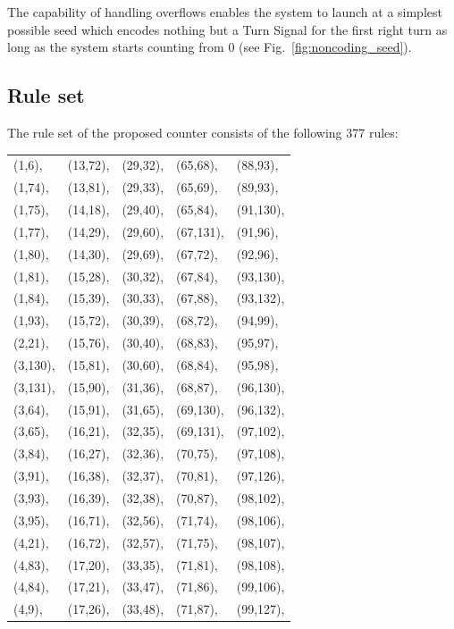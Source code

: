 \documentclass[twocolumn]{svjour3}
\begin{document}
The capability of handling overflows enables the system to launch at a simplest possible seed which encodes nothing but a Turn Signal for the first right turn as long as the system starts counting from 0 (see Fig.~\ref{fig:noncoding_seed}). 

\subsection{Rule set}
\label{subsect:ruleset}

The rule set of the proposed counter consists of the following 377 rules: 
\begin{center}
\begin{supertabular}[tb]{l l l l l}
\label{table:rule}
(1,6),&(13,72),&(29,32), &(65,68),&(88,93),\\
(1,74),&(13,81),&(29,33),&(65,69),&(89,93),\\
(1,75),&(14,18),&(29,40),&(65,84),&(91,130),\\
(1,77),&(14,29),&(29,60),&(67,131),&(91,96),\\
(1,80),&(14,30),&(29,69),&(67,72),&(92,96),\\
(1,81),&(15,28),&(30,32),&(67,84),&(93,130),\\
(1,84),&(15,39),&(30,33),&(67,88),&(93,132),\\
(1,93),&(15,72),&(30,39),&(68,72),&(94,99),\\
(2,21),&(15,76),&(30,40),&(68,83),&(95,97),\\
(3,130),&(15,81),&(30,60),&(68,84),&(95,98),\\
(3,131),&(15,90),&(31,36),&(68,87),&(96,130),\\
(3,64),&(15,91),&(31,65),&(69,130),&(96,132),\\
(3,65),&(16,21),&(32,35),&(69,131),&(97,102),\\
(3,84),&(16,27),&(32,36),&(70,75),&(97,108),\\
(3,91),&(16,38),&(32,37),&(70,81),&(97,126),\\
(3,93),&(16,39),&(32,38),&(70,87),&(98,102),\\
(3,95),&(16,71),&(32,56),&(71,74),&(98,106),\\
(4,21),&(16,72),&(32,57),&(71,75),&(98,107),\\
(4,83),&(17,20),&(33,35),&(71,81),&(98,108),\\
(4,84),&(17,21),&(33,47),&(71,86),&(99,106),\\
(4,9),&(17,26),&(33,48),&(71,87),&(99,127),\\

\end{supertabular}
\end{center}
\end{document}
